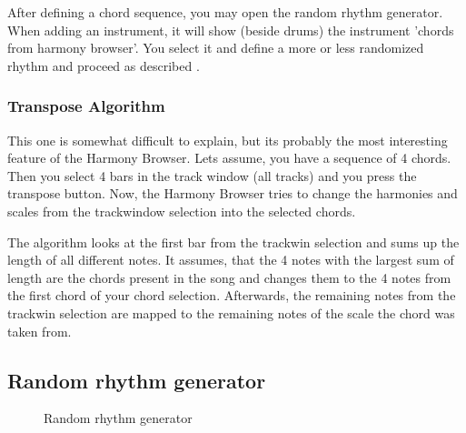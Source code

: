 \documentclass[letterpaper]{report}
\begin{document}
After defining a chord sequence, you may open the random rhythm
generator. When adding an instrument, it will show (beside drums) the
instrument 'chords from harmony browser'. You select it and define a more or
less randomized rhythm and proceed as described .

\subsubsection{Transpose Algorithm}

This one is somewhat difficult to explain, but its probably the most
interesting feature of the Harmony Browser.  Lets assume, you have a
sequence of 4 chords. Then you select 4 bars in the track window (all
tracks) and you press the transpose button.  Now, the Harmony Browser
tries to change the harmonies and scales from the trackwindow selection
into the selected chords.

The algorithm looks at the first bar from the trackwin selection and
sums up the length of all different notes. It assumes, that the 4 notes with the
largest sum of length are the chords present in the song and changes them
to the 4 notes from the first chord of your chord selection. Afterwards,
the remaining notes from the trackwin selection are mapped to the remaining
notes of the scale the chord was taken from.



\subsection{Random rhythm generator}\label{randrhy}

\begin{figure}
\caption{Random rhythm generator}
\end{figure}
\end{document}
